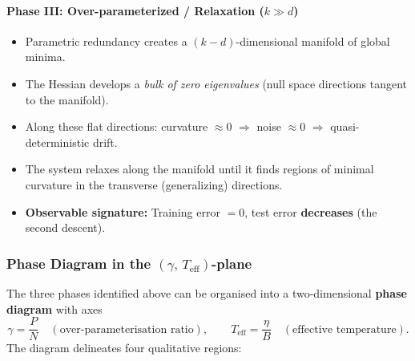 \documentclass[
  journal=largetwo,
  simfonts=false,
  year=2025,
  volume=37,
]{cup-journal}
\begin{document}
\paragraph{Phase III: Over-parameterized / Relaxation ($k \gg d$)}
\begin{itemize}
    \item Parametric redundancy creates a $(k-d)$-dimensional manifold of global minima.
    \item The Hessian develops a \textit{bulk of zero eigenvalues} (null space directions tangent to the manifold).
    \item Along these flat directions: curvature $\approx 0$ $\Rightarrow$ noise $\approx 0$ $\Rightarrow$ quasi-deterministic drift.
    \item The system relaxes along the manifold until it finds regions of minimal curvature in the transverse (generalizing) directions.
    \item \textbf{Observable signature:} Training error $= 0$, test error \textbf{decreases} (the second descent).
\end{itemize}

\subsubsection{Phase Diagram in the $(\gamma,\,T_{\mathrm{eff}})$-plane}\label{sec:phase_diagram}

The three phases identified above can be organised into a two-dimensional \textbf{phase diagram} with axes
\begin{equation}
    \gamma = \frac{P}{N} \quad (\text{over-parameterisation ratio}), \qquad
    T_{\mathrm{eff}} = \frac{\eta}{B} \quad (\text{effective temperature}).
\end{equation}
The diagram delineates four qualitative regions:
\end{document}
